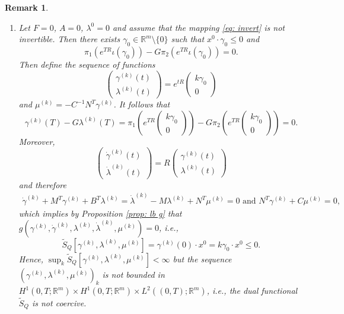 \documentclass[11pt]{article}
\newcommand{\R}{\mathbb R}
\newtheorem{remark}{Remark}[section]
\begin{document}
\begin{remark}
\begin{enumerate}
    \item Let $F=0$, $A=0$, $\lambda^0 = 0$ and assume that the mapping \eqref{eq: invert} is not invertible.
    Then there exists $\gamma_0 \in \R^m \setminus \{ 0\}$ such that $x^0 \cdot \gamma_0 \leq 0$ and 
    \[
    \pi_1 (e^{TR} \iota(\gamma_0)) - G \pi_2 (e^{TR} \iota (\gamma_0)) = 0.
    \]
    Then define the sequence of functions
    \[
    \begin{pmatrix} \gamma^{(k)}(t) \\ \lambda^{(k)}(t) \end{pmatrix} = e^{tR} \begin{pmatrix} k \gamma_0 \\ 0  \end{pmatrix}
    \]
    and $\mu^{(k)} = -C^{-1} N^T \gamma^{(k)}$.
    It follows that 
    \[
    \gamma^{(k)}(T) - G\lambda^{(k)}(T)   = \pi_1\left( e^{TR} \begin{pmatrix} k \gamma_0 \\ 0  \end{pmatrix}\right) - G \pi_2\left( e^{TR} \begin{pmatrix} k \gamma_0 \\ 0  \end{pmatrix}\right) = 0.
    \]
    Moreover,
    \[
    \begin{pmatrix} \dot{\gamma}^{(k)}(t) \\ \dot{\lambda}^{(k)}(t) \end{pmatrix} = R \begin{pmatrix} \gamma^{(k)}(t) \\ \lambda^{(k)}(t) \end{pmatrix}
    \]
    and therefore
    \begin{align*}
\dot{\gamma}^{(k)} + M^T \gamma^{(k)} + B^T \lambda^{(k)} = \dot{\lambda}^{(k)} - M \lambda^{(k)} + N^T \mu^{(k)} = 0 \text{ and } N^T \gamma^{(k)} + C\mu^{(k)} = 0,
    \end{align*}
    which implies by Proposition \ref{prop: lb g} that $g(\gamma^{(k)},\dot{\gamma}^{(k)},\lambda^{(k)},\dot{\lambda}^{(k)}, \mu^{(k)}) = 0$, i.e.,
    \[
    \tilde{S}_Q[\gamma^{(k)},\lambda^{(k)},\mu^{(k)}] = \gamma^{(k)}(0)\cdot x^0 = k \gamma_0 \cdot x^0 \leq 0.
    \]
    Hence, $\sup_k \tilde{S}_Q[\gamma^{(k)},\lambda^{(k)},\mu^{(k)}] < \infty$ but the sequence $(\gamma^{(k)},\lambda^{(k)}, \mu^{(k)})_k$ is not bounded in  $H^1(0,T; \R^m) \times H^1(0,T; \R^m) \times L^2((0,T); \R^m)$, i.e., the dual functional $\tilde{S}_Q$ is not coercive.

\end{enumerate}
\end{remark}
\end{document}
